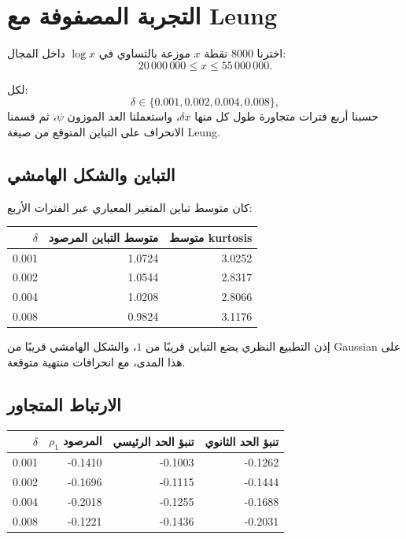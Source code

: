 \documentclass[12pt]{article}
\begin{document}
\section{التجربة المصفوفة مع Leung}

اخترنا \(8000\) نقطة \(x\) موزعة بالتساوي في \(\log x\) داخل المجال:
\[
20\,000\,000\le x\le55\,000\,000.
\]

لكل:
\[
\delta\in\{0.001,0.002,0.004,0.008\},
\]
حسبنا أربع فترات متجاورة طول كل منها \(\delta x\)، واستعملنا العد الموزون
\(\psi\)، ثم قسمنا الانحراف على التباين المتوقع من صيغة Leung.

\subsection{التباين والشكل الهامشي}

كان متوسط تباين المتغير المعياري عبر الفترات الأربع:

\begin{center}
\begin{tabular}{rrr}
\toprule
\(\delta\) & متوسط التباين المرصود & متوسط kurtosis\\
\midrule
0.001 & 1.0724 & 3.0252\\
0.002 & 1.0544 & 2.8317\\
0.004 & 1.0208 & 2.8066\\
0.008 & 0.9824 & 3.1176\\
\bottomrule
\end{tabular}
\end{center}

إذن التطبيع النظري يضع التباين قريبًا من \(1\)، والشكل الهامشي قريبًا
من Gaussian على هذا المدى، مع انحرافات منتهية متوقعة.

\subsection{الارتباط المتجاور}

\begin{center}
\begin{tabular}{rrrr}
\toprule
\(\delta\) & \(\rho_1\) المرصود &
تنبؤ الحد الرئيسي & تنبؤ الحد الثانوي\\
\midrule
0.001 & -0.1410 & -0.1003 & -0.1262\\
0.002 & -0.1696 & -0.1115 & -0.1444\\
0.004 & -0.2018 & -0.1255 & -0.1688\\
0.008 & -0.1221 & -0.1436 & -0.2031\\
\bottomrule
\end{tabular}
\end{center}
\end{document}
